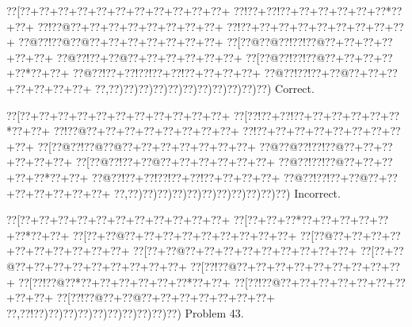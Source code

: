 \documentclass[a5paper]{article}
\begin{document}
\begin{center}
{\goo
\0??[\0??+\0??+\0??+\0??+\0??+\0??+\0??+\0??+\0??+\0??+\0??+
\0??!\0??+\0??!\0??+\0??+\0??+\0??+\0??+\0??*\0??+\0??+
\0??!\0??@\0??+\0??+\0??+\0??+\0??+\0??+\0??+\0??+
\0??!\0??+\0??+\0??+\0??+\0??+\0??+\0??+\0??+\0??+
\0??@\0??!\0??@\0??@\0??+\0??+\0??+\0??+\0??+\0??+\0??+
\0??[\0??@\0??@\0??!\0??!\0??@\0??+\0??+\0??+\0??+\0??+\0??+
\0??@\0??!\0??+\0??@\0??+\0??+\0??+\0??+\0??+\0??+
\0??[\0??@\0??!\0??!\0??@\0??+\0??+\0??+\0??+\0??*\0??+\0??+
\0??@\0??!\0??+\0??!\0??!\0??+\0??!\0??+\0??+\0??+\0??+
\0??@\0??!\0??!\0??+\0??@\0??+\0??+\0??+\0??+\0??+\0??+\0??+
\0??,\0??)\0??)\0??)\0??)\0??)\0??)\0??)\0??)\0??)\0??)\0??)
}
Correct. 

\end{center}
\begin{center}
{\goo
\0??[\0??+\0??+\0??+\0??+\0??+\0??+\0??+\0??+\0??+\0??+\0??+
\0??[\0??!\0??+\0??!\0??+\0??+\0??+\0??+\0??+\0??*\0??+\0??+
\0??!\0??@\0??+\0??+\0??+\0??+\0??+\0??+\0??+\0??+
\0??!\0??+\0??+\0??+\0??+\0??+\0??+\0??+\0??+\0??+
\0??[\0??@\0??!\0??@\0??@\0??+\0??+\0??+\0??+\0??+\0??+\0??+
\0??@\0??@\0??!\0??!\0??@\0??+\0??+\0??+\0??+\0??+\0??+
\0??[\0??@\0??!\0??+\0??@\0??+\0??+\0??+\0??+\0??+\0??+
\0??@\0??!\0??!\0??@\0??+\0??+\0??+\0??+\0??*\0??+\0??+
\0??@\0??!\0??+\0??!\0??!\0??+\0??!\0??+\0??+\0??+\0??+
\0??@\0??!\0??!\0??+\0??@\0??+\0??+\0??+\0??+\0??+\0??+\0??+
\0??,\0??)\0??)\0??)\0??)\0??)\0??)\0??)\0??)\0??)\0??)\0??)
}
Incorrect. 

\end{center}
\newpage
\begin{center}
{\goo
\0??[\0??+\0??+\0??+\0??+\0??+\0??+\0??+\0??+\0??+\0??+\0??+
\0??[\0??+\0??+\0??*\0??+\0??+\0??+\0??+\0??+\0??*\0??+\0??+
\0??[\0??+\0??@\0??+\0??+\0??+\0??+\0??+\0??+\0??+\0??+\0??+
\0??[\0??@\0??+\0??+\0??+\0??+\0??+\0??+\0??+\0??+\0??+\0??+
\0??[\0??+\0??@\0??+\0??+\0??+\0??+\0??+\0??+\0??+\0??+\0??+
\0??[\0??+\0??@\0??+\0??+\0??+\0??+\0??+\0??+\0??+\0??+\0??+
\0??[\0??!\0??@\0??+\0??+\0??+\0??+\0??+\0??+\0??+\0??+\0??+
\0??[\0??!\0??@\0??*\0??+\0??+\0??+\0??+\0??+\0??*\0??+\0??+
\0??[\0??!\0??@\0??+\0??+\0??+\0??+\0??+\0??+\0??+\0??+\0??+
\0??[\0??!\0??@\0??+\0??@\0??+\0??+\0??+\0??+\0??+\0??+\0??+
\0??,\0??!\0??)\0??)\0??)\0??)\0??)\0??)\0??)\0??)\0??)\0??)
}
Problem 43.

\end{center}
\end{document}
